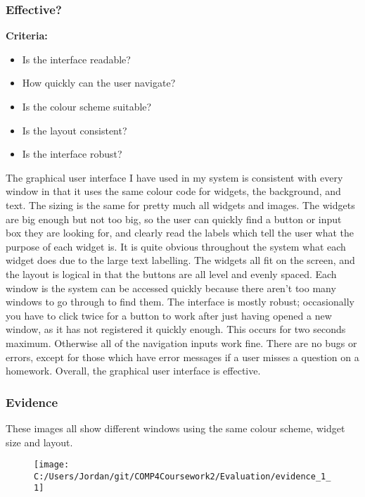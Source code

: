 \subsubsection{Effective?}

\textbf{Criteria: }

\begin{itemize}
	\item Is the interface readable?
	\item How quickly can the user navigate?
	\item Is the colour scheme suitable?
	\item Is the layout consistent?
	\item Is the interface robust?
\end{itemize}

The graphical user interface I have used in my system is consistent with every window in that it uses the same colour code for widgets, the background, and text. The sizing is the same for pretty much all widgets and images. The widgets are big enough but not too big, so the user can quickly find a button or input box they are looking for, and clearly read the labels which tell the user what the purpose of each widget is. It is quite obvious throughout the system what each widget does due to the large text labelling. The widgets all fit on the screen, and the layout is logical in that the buttons are all level and evenly spaced. Each window is the system can be accessed quickly because there aren't too many windows to go through to find them. The interface is mostly robust; occasionally you have to click twice for a button to work after just having opened a new window, as it has not registered it quickly enough. This occurs for two seconds maximum. Otherwise all of the navigation inputs work fine. There are no bugs or errors, except for those which have error messages if a user misses a question on a homework. Overall, the graphical user interface is effective.

\subsubsection{Evidence}

These images all show different windows using the same colour scheme, widget size and layout.

\begin{figure}[H]
	\texttt{[image: C:/Users/Jordan/git/COMP4Coursework2/Evaluation/evidence\_1\_1]}
\end{figure}

